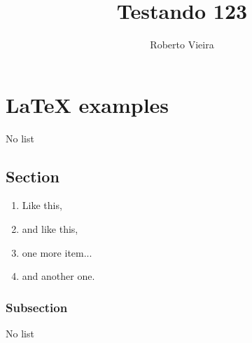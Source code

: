 \documentclass{article}
\title{Testando 123}
\author{Roberto Vieira}
\begin{document}
\chapter{LaTeX examples}

No list

\section{Section}

\begin{enumerate} \item Like this,
\item and like this,
\item one more item...
\item and another one.
\end{enumerate}

\subsection{Subsection}

No list
\end{document}
